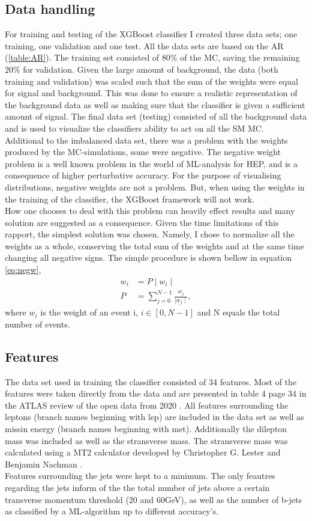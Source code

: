 \documentclass{article}
\begin{document}
\subsection{Data handling}\label{sec:DH}
For training and testing of the XGBoost classifier I created three data sets; one training, one validation and one test. All the data sets are based on the AR (\ref{table:AR}). The training set consisted of $80\%$ of the MC, saving the remaining $20\%$ for validation. Given the large amount of background, the data (both training and validation) was scaled such that the sum of the weights were equal for signal and background. This was done to ensure a realistic representation of the background data as well as making sure that the classifier is given a sufficient amount of signal. The final data set (testing) consisted of all the background data and is used to visualize the classifiers ability to act on all the SM MC.
\\
Additional to the imbalanced data set, there was a problem with the weights produced by the MC-simulations, some were negative. The negative weight problem is a well known problem in the world of ML-analysis for HEP, and is a consequence of higher perturbative accuracy. For the purpose of visualising distributions, negative weights are not a problem. But, when using the weights in the training of the classifier, the XGBoost framework will not work. 
\\
How one chooses to deal with this problem can heavily effect results and many solution are suggested as a consequence. Given the time limitations of this rapport, the simplest solution was chosen. Namely, I chose to normalize all the weights as a whole, conserving the total sum of the weights and at the same time changing all negative signs. The simple procedure is shown bellow in equation \ref{eq:negw},
\begin{align}\label{eq:negw}
    w_i & = P \mid w_i \mid\,  \\
    P  & =  \sum_{j=0}^{N-1}\frac{ w_j}{\mid w_j \mid},
\end{align}
where $w_i$ is the weight of an event i, $i \in [0,N-1]$ and N equals the total number of events.
\subsection{Features}
The data set used in training the classifier consisted of 34 features. Most of the features were taken directly from the data and are presented in table 4 page 34 in the ATLAS review of the open data from 2020 \cite{ATL-OREACH-PUB-2020-001}. All features surrounding the leptons (branch names beginning with lep) are included in the data set as well as missin energy (branch names beginning with met). Additionally the dilepton mass was included as well as the stransverse mass. The stransverse mass was calculated using a MT2 calculator developed by Christopher G. Lester and Benjamin Nachman \cite{Lester_2015}.
\\
Features surrounding the jets were kept to a minimum. The only feautres regarding the jets inform of the the total number of jets above a certain transverse momentum threshold (20 and 60GeV), as well as the number of b-jets as classified by a ML-algorithm up to different accuracy's.
\end{document}
